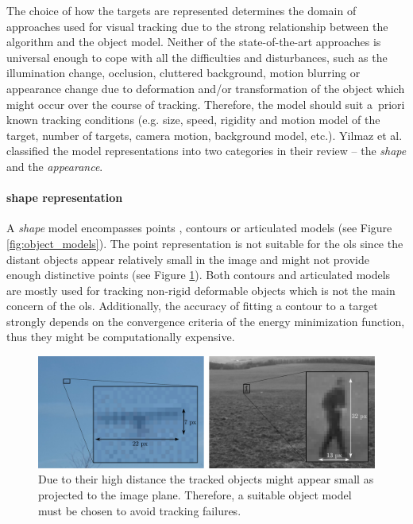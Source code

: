 The choice of how the targets are represented determines the domain of approaches used for visual tracking due to the strong relationship between the algorithm and the object model. Neither of the state-of-the-art approaches is universal enough to cope with all the difficulties and disturbances, such as the illumination change, occlusion, cluttered background, motion blurring or appearance change due to deformation and/or transformation of the object \cite{Li:2013:SAM:2508037.2508039} which might occur over the course of tracking. Therefore, the model should suit a~priori known tracking conditions (e.g. size, speed, rigidity and motion model of the target, number of targets, camera motion, background model, etc.). Yilmaz et al. classified the model representations into two categories in their review \cite{Yilmaz:2006:OTS:1177352.1177355} -- the \textit{shape} and the \textit{appearance}. 


\paragraph{shape representation} 
A \textit{shape} model encompasses points \cite{Tomasi91detectionand}, contours \cite{Kass88snakes:active, ActiveContour-BasedVisualTracking} or articulated models \cite{Delamarre2001328, conf/isvc/MigniotA13} (see Figure \ref{fig:object_models}). The point representation is not suitable for the \gls{ols} since the distant objects appear relatively small in the image and might not provide enough distinctive points (see Figure \ref{fig:two_small_tracked_objects}). Both contours and articulated models are mostly used for tracking non-rigid deformable objects which is not the main concern of the \gls{ols}. Additionally, the accuracy of fitting a contour to a target strongly depends on the convergence criteria of the energy minimization function, thus they might be computationally expensive.

\begin{figure}[htb]\centering
	\centering
	\includegraphics[width=0.7\linewidth]{fig/two_small_tracked_objects.pdf}
	\caption{Due to their high distance the tracked objects might appear small as projected to the image plane. Therefore, a suitable object model must be chosen to avoid tracking failures.}
	\label{fig:two_small_tracked_objects}
\end{figure}

